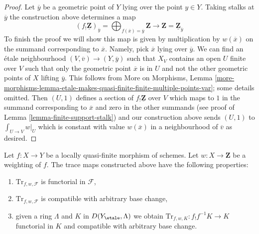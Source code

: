 \begin{proof}
\medskip\noindent
Let $\overline{y}$ be a geometric point of $Y$ lying over the point $y \in Y$.
Taking stalks at $\overline{y}$ the construction above determines a map
$$
(f_!\underline{\mathbf{Z}})_{\overline{y}}
= \bigoplus\nolimits_{f(\overline{x}) = \overline{y}} \mathbf{Z}
\longrightarrow
\mathbf{Z} = \underline{\mathbf{Z}}_{\overline{y}}
$$
To finish the proof we will show this map is given by multiplication by
$w(\overline{x})$ on the summand corresponding to $\overline{x}$.
Namely, pick $\overline{x}$ lying over $\overline{y}$.
We can find an \'etale neighbourhood $(V, \overline{v}) \to (Y, \overline{y})$
such that $X_V$ contains an open $U$ finite over $V$
such that only the geometric point $\overline{x}$ is in $U$
and not the other geometric points of $X$ lifting $\overline{y}$.
This follows from More on Morphisms, Lemma
\ref{more-morphisms-lemma-etale-makes-quasi-finite-finite-multiple-points-var};
some details omitted. Then $(U, 1)$ defines a section of
$f_!\underline{\mathbf{Z}}$ over $V$ which maps to $1$ in the summand
corresponding to $\overline{x}$ and zero in the other summands
(see proof of Lemma \ref{lemma-finite-support-stalk}) and
our construction above sends $(U, 1)$ to $\int_{U \to V} w|_U$
which is constant with value $w(\overline{x})$ in a neighbourhood
of $\overline{v}$ as desired.
\end{proof}

\begin{lemma}
\label{lemma-properties-trace-map}
Let $f : X \to Y$ be a locally quasi-finite morphism of schemes.
Let $w : X \to \mathbf{Z}$ be a weighting of $f$. The trace maps
constructed above have the following properties:
\begin{enumerate}
\item $\text{Tr}_{f, w, \mathcal{F}}$ is functorial in $\mathcal{F}$,
\item $\text{Tr}_{f, w, \mathcal{F}}$ is compatible with arbitrary base change,
\item given a ring $\Lambda$ and $K$ in $D(Y_\etale, \Lambda)$
we obtain $\text{Tr}_{f, w, K} : f_!f^{-1}K \to K$ functorial in $K$
and compatible with arbitrary base change.
\end{enumerate}
\end{lemma}

